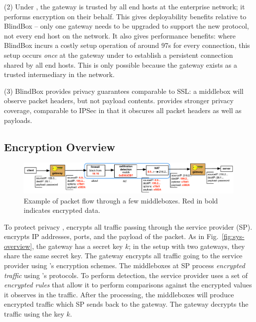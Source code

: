 \noindent(2) Under \sys, the gateway is trusted by all end hosts at the enterprise network; it performs encryption on their behalf. This gives \sys deployability benefits relative to BlindBox -- only one gateway needs to be upgraded to support the new protocol, not every end host on the network. It also gives performance benefits: where BlindBox incurs a costly setup operation of around 97s for every connection, this setup occurs {\it once} at the gateway under \sys to establish a persistent connection shared by all end hosts. This is only possible because the gateway exists as a trusted intermediary in the network.

\noindent(3) BlindBox provides privacy guarantees comparable to SSL: a middlebox will observe packet headers, but not payload contents. \sys provides stronger privacy coverage, comparable to IPSec in that it obscures all packet headers as well as payloads.

%
%
\subsection{Encryption Overview}

\begin{figure}[t!]
\centering
  \includegraphics[width=6.7in]{fig/packetpath.pdf}
\caption{Example of packet flow through a few middleboxes. Red in bold indicates encrypted data. \label{fig:packetflow}}
\end{figure}



To protect privacy , \sys encrypts all traffic passing through the service provider (SP).
\sys encrypts IP addresses, ports, and the payload of the packet.
As in Fig.~\ref{fig:sys-overview}, the gateway has a secret key $k$; in the setup with two gateways, they share
the same secret key. The gateway encrypts all traffic going to the service provider using \sys's encryption schemes.
The middleboxes at SP process {\em encrypted traffic} using \sys's protocols. 
To perform detection, the service provider uses a set of {\it encrypted rules} that allow it to perform comparisons against the encrypted values it observes in the traffic.
After the processing, the middleboxes
will produce encrypted traffic which SP sends back to the gateway. The gateway decrypts the traffic using the key $k$.

